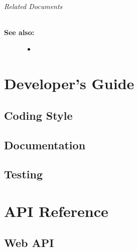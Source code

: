 \documentclass[letterpaper,10pt,english]{sphinxmanual}
\begin{document}
\subparagraph{Related Documents}
\label{user_guide:id6}\begin{description}
\item[{\textbf{See also:}}] \leavevmode\begin{itemize}
\item {} 

\end{itemize}

\end{description}


\chapter{Developer's Guide}
\label{index:developer-s-guide}

\section{Coding Style}
\label{developer_guide:coding-style}\label{developer_guide::doc}\label{developer_guide:developer-guide}

\section{Documentation}
\label{developer_guide:documentation}

\section{Testing}
\label{developer_guide:testing}

\chapter{API Reference}
\label{index:api-reference}

\section{Web API}
\label{api_ref::doc}\label{api_ref:web-api}
\end{document}
